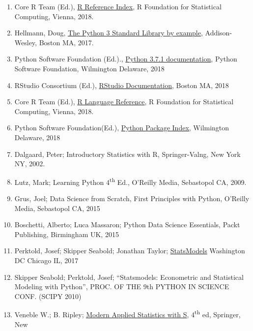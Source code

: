 \documentclass[]{book}
\theoremstyle{definition}
\theoremstyle{definition}
\theoremstyle{definition}
\theoremstyle{remark}
\begin{document}
\begin{enumerate}
\def\labelenumi{\arabic{enumi}.}
\item
  Core R Team (Ed.),
  \href{https://cran.cnr.berkeley.edu/doc/manuals/r-release/fullrefman.pdf}{R
  Reference Index}, R Foundation for Statistical Computing, Vienna,
  2018.
\item
  Hellmann, Doug,
  \href{https://www.amazon.com/Python-Standard-Library-Example-Developers-ebook/dp/B072QZZDV7}{The
  Python 3 Standard Library by example}, Addison-Wesley, Boston MA,
  2017.
\item
  Python Software Foundation (Ed.).,
  \href{https://docs.python.org/3.7/}{Python 3.7.1 documentation},
  Python Software Foundation, Wilmington Delaware, 2018
\item
  RStudio Consortium (Ed.),
  \href{https://support.rstudio.com/hc/en-us/categories/200035113-Documentation}{RStudio
  Documentation}, Boston MA, 2018
\item
  Core R Team (Ed.),
  \href{https://cran.r-project.org/doc/manuals/r-release/R-lang.html}{R
  Language Reference}, R Foundation for Statistical Computing, Vienna,
  2018.
\item
  Python Software Foundation(Ed.), \href{https://pypi.org/}{Python
  Package Index}, Wilmington Delaware, 2018
\item
  Dalgaard, Peter; Introductory Statistics with R, Springer-Valng, New
  York NY, 2002.
\item
  Lutz, Mark; Learning Python 4\textsuperscript{th} Ed., O'Reilly Media,
  Sebastopol CA, 2009.
\item
  Grus, Joel; Data Science from Scratch, First Principles with Python,
  O'Reilly Media, Sebastopol CA, 2015
\item
  Boschetti, Alberto; Luca Massaron; Python Data Science Essentials,
  Packt Publishing, Birmingham UK, 2015
\item
  Perktold, Josef; Skipper Seabold; Jonathan Taylor;
  \href{https://www.statsmodels.org/stable/index.html}{StatsModels}
  Washington DC Chicago IL, 2017
\item
  Skipper Seabold; Perktold, Josef; ``Statsmodels: Econometric and
  Statistical Modeling with Python'', PROC. OF THE 9th PYTHON IN SCIENCE
  CONF. (SCIPY 2010)
\item
  Veneble W.; B. Ripley;
  \href{https://www.amazon.com/Modern-Applied-Statistics-Computing-ebook/dp/B000S1LWTE/ref=mt_kindle?_encoding=UTF8\&me=\&qid=1544630778}{Modern
  Applied Statistics with S}, 4\textsuperscript{th} ed, Springer, New

\end{enumerate}
\end{document}
